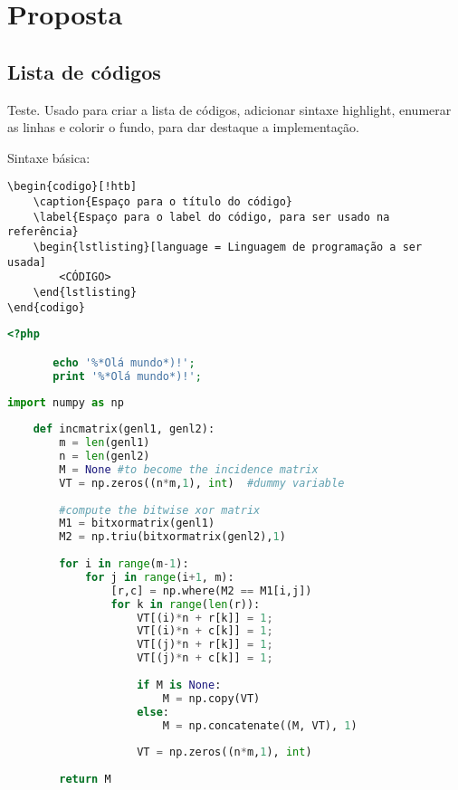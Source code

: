 \chapter{Proposta}

\section{Lista de códigos}
Teste.
Usado para criar a lista de códigos, adicionar sintaxe highlight, enumerar as linhas e colorir o fundo, para dar destaque a implementação.

Sintaxe básica:
\begin{verbatim}
\begin{codigo}[!htb]
    \caption{Espaço para o título do código}
    \label{Espaço para o label do código, para ser usado na referência}  
    \begin{lstlisting}[language = Linguagem de programação a ser usada]
        <CÓDIGO>
    \end{lstlisting}
\end{codigo}
\end{verbatim}

\begin{codigo}[htb]
  \caption{Código PHP}
  \label{codigophp}
  \begin{lstlisting}[language = php]
       <?php

       echo '%*Olá mundo*)!';
       print '%*Olá mundo*)!';
  \end{lstlisting}
\end{codigo}

\begin{codigo}
  \caption{Código python}
  \label{codigopython}
  \begin{lstlisting}[language = python]
    import numpy as np
 
    def incmatrix(genl1, genl2):
        m = len(genl1)
        n = len(genl2)
        M = None #to become the incidence matrix
        VT = np.zeros((n*m,1), int)  #dummy variable
 
        #compute the bitwise xor matrix
        M1 = bitxormatrix(genl1)
        M2 = np.triu(bitxormatrix(genl2),1) 
 
        for i in range(m-1):
            for j in range(i+1, m):
                [r,c] = np.where(M2 == M1[i,j])
                for k in range(len(r)):
                    VT[(i)*n + r[k]] = 1;
                    VT[(i)*n + c[k]] = 1; 
                    VT[(j)*n + r[k]] = 1;
                    VT[(j)*n + c[k]] = 1;
 
                    if M is None:
                        M = np.copy(VT)
                    else:
                        M = np.concatenate((M, VT), 1)
 
                    VT = np.zeros((n*m,1), int)
 
        return M
\end{lstlisting}
\end{codigo}

